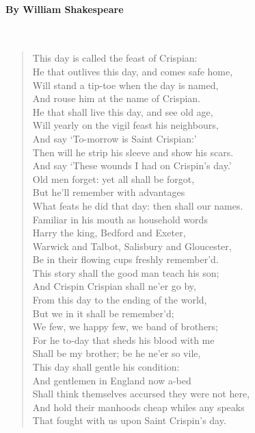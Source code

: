 \documentclass[12pt, openany, letterpaper]{memoir}
\begin{document}
\paragraph{By William Shakespeare}~
\begin{verse}
	This day is called the feast of Crispian:\\
	He that outlives this day, and comes safe home,\\
	Will stand a tip-toe when the day is named,\\
	And rouse him at the name of Crispian.\\
	He that shall live this day, and see old age,\\
	Will yearly on the vigil feast his neighbours,\\
	And say ‘To-morrow is Saint Crispian:’\\
	Then will he strip his sleeve and show his scars.\\
	And say ‘These wounds I had on Crispin’s day.’\\
	Old men forget: yet all shall be forgot,\\
	But he’ll remember with advantages\\
	What feats he did that day: then shall our names.\\
	Familiar in his mouth as household words\\
	Harry the king, Bedford and Exeter,\\
	Warwick and Talbot, Salisbury and Gloucester,\\
	Be in their flowing cups freshly remember’d.\\
	This story shall the good man teach his son;\\
	And Crispin Crispian shall ne’er go by,\\
	From this day to the ending of the world,\\
	But we in it shall be remember’d;\\
	We few, we happy few, we band of brothers;\\
	For he to-day that sheds his blood with me\\
	Shall be my brother; be he ne’er so vile,\\
	This day shall gentle his condition:\\
	And gentlemen in England now a-bed\\
	Shall think themselves accursed they were not here,\\
	And hold their manhoods cheap whiles any speaks\\
	That fought with us upon Saint Crispin’s day.
\end{verse}
\end{document}
